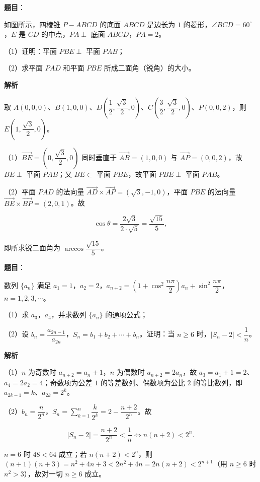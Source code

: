 \begin{answer}

\textbf{题目}：

如图所示，四棱锥 $P-ABCD$ 的底面 $ABCD$ 是边长为 $1$ 的菱形，$\angle BCD=60^\circ$，$E$ 是 $CD$ 的中点，$PA\perp$ 底面 $ABCD$，$PA=2$。

（1）证明：平面 $PBE\perp$ 平面 $PAB$；

（2）求平面 $PAD$ 和平面 $PBE$ 所成二面角（锐角）的大小。
\nopagebreak[4]
\begin{center}\end{center}
\nopagebreak[4]
\textbf{解析}

取 $A(0,0,0)$、$B(1,0,0)$、$D\left(\dfrac12,\dfrac{\sqrt3}2,0\right)$、$C\left(\dfrac32,\dfrac{\sqrt3}2,0\right)$、$P(0,0,2)$，则 $E\left(1,\dfrac{\sqrt3}2,0\right)$。

（1）$\overrightarrow{BE}=\left(0,\dfrac{\sqrt3}2,0\right)$ 同时垂直于 $\overrightarrow{AB}=(1,0,0)$ 与 $\overrightarrow{AP}=(0,0,2)$，故 $BE\perp$ 平面 $PAB$；又 $BE\subset$ 平面 $PBE$，故平面 $PBE\perp$ 平面 $PAB$。

（2）平面 $PAD$ 的法向量 $\overrightarrow{AD}\times\overrightarrow{AP}=(\sqrt3,-1,0)$，平面 $PBE$ 的法向量 $\overrightarrow{BE}\times\overrightarrow{BP}=(2,0,1)$。故

\nopagebreak[4]
\[\cos\theta=\frac{2\sqrt3}{2\cdot\sqrt5}=\frac{\sqrt{15}}5,\]

即所求锐二面角为 $\arccos\dfrac{\sqrt{15}}5$。


\end{answer}
\begin{answer}

\textbf{题目}：

数列 $\{a_n\}$ 满足 $a_1=1$，$a_2=2$，$a_{n+2}=\left(1+\cos^2\dfrac{n\pi}2\right)a_n+\sin^2\dfrac{n\pi}2$，$n=1,2,3,\cdots$。

（1）求 $a_3$，$a_4$，并求数列 $\{a_n\}$ 的通项公式；

（2）设 $b_n=\dfrac{a_{2n-1}}{a_{2n}}$，$S_n=b_1+b_2+\cdots+b_n$。证明：当 $n\geqslant6$ 时，$|S_n-2|<\dfrac1n$。

\textbf{解析}

（1）$n$ 为奇数时 $a_{n+2}=a_n+1$，$n$ 为偶数时 $a_{n+2}=2a_n$，故 $a_3=a_1+1=2$、$a_4=2a_2=4$；奇数项为公差 $1$ 的等差数列、偶数项为公比 $2$ 的等比数列，即 $a_{2k-1}=k$、$a_{2k}=2^k$。

（2）$b_n=\dfrac{n}{2^n}$，$S_n=\sum\limits_{k=1}^n\dfrac k{2^k}=2-\dfrac{n+2}{2^n}$。故

\nopagebreak[4]
\[|S_n-2|=\frac{n+2}{2^n}<\frac1n\iff n(n+2)<2^n.\]

$n=6$ 时 $48<64$ 成立；若 $n(n+2)<2^n$，则 $(n+1)(n+3)=n^2+4n+3<2n^2+4n=2n(n+2)<2^{n+1}$（用 $n\geqslant6$ 时 $n^2>3$），故对一切 $n\geqslant6$ 成立。


\end{answer}
